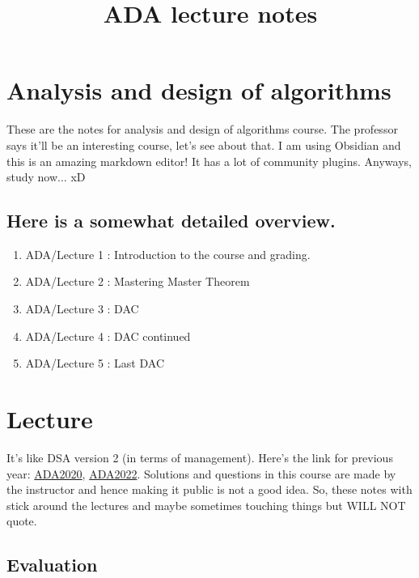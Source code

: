 \documentclass[a4paper
]{article}
\title{ADA lecture notes}
\author{}
\date{}
\providecommand{\tightlist}{%
  \setlength{\itemsep}{0pt}\setlength{\parskip}{0pt}}
\begin{document}
\maketitle

\hypertarget{analysis-and-design-of-algorithms}{%
\section{Analysis and design of
algorithms}\label{analysis-and-design-of-algorithms}}

These are the notes for analysis and design of algorithms course. The
professor says it'll be an interesting course, let's see about that. I
am using Obsidian and this is an amazing markdown editor! It has a lot
of community plugins. Anyways, study now... xD

\hypertarget{here-is-a-somewhat-detailed-overview.}{%
\subsection{Here is a somewhat detailed
overview.}\label{here-is-a-somewhat-detailed-overview.}}

\begin{enumerate}
\tightlist
\item
  ADA/Lecture 1 : Introduction to the course and grading.
\item
  ADA/Lecture 2 : Mastering Master Theorem
\item
  ADA/Lecture 3 : DAC
\item
  ADA/Lecture 4 : DAC continued
\item
  ADA/Lecture 5 : Last DAC
\end{enumerate}

\hfill\break

\hypertarget{lecture-1}{%
\section{Lecture}\label{lecture-1}}

It's like DSA version 2 (in terms of management). Here's the link for
previous year:
\href{https://sites.google.com/iiitd.ac.in/ada2020/lectures}{ADA2020},
\href{https://sites.google.com/iiitd.ac.in/ada22}{ADA2022}. Solutions
and questions in this course are made by the instructor and hence making
it public is not a good idea. So, these notes with stick around the
lectures and maybe sometimes touching things but WILL NOT quote.

\hypertarget{evaluation}{%
\subsection{Evaluation}\label{evaluation}}
\end{document}
